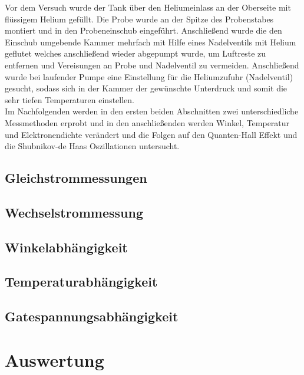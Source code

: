 \documentclass[12pt,a4paper]{article}
\begin{document}
	Vor dem Versuch wurde der Tank über den Heliumeinlass an der Oberseite mit flüssigem Helium gefüllt. Die Probe wurde an der Spitze des Probenstabes montiert und in den Probeneinschub eingeführt. Anschließend wurde die den Einschub umgebende Kammer mehrfach mit Hilfe eines Nadelventils mit Helium geflutet welches anschließend wieder abgepumpt wurde, um Luftreste zu entfernen und Vereisungen an Probe und Nadelventil zu vermeiden. Anschließend wurde bei laufender Pumpe eine Einstellung für die Heliumzufuhr (Nadelventil) gesucht, sodass sich in der Kammer der gewünschte Unterdruck und somit die sehr tiefen Temperaturen einstellen.\\
	
	Im Nachfolgenden werden in den ersten beiden Abschnitten zwei unterschiedliche Messmethoden erprobt und in den anschließenden werden Winkel, Temperatur und Elektronendichte verändert und die Folgen auf den Quanten-Hall Effekt und die Shubnikov-de Haas Oszillationen untersucht.
	
	\subsection{Gleichstrommessungen}
	\label{ch:dc}
	
	\subsection{Wechselstrommessung}
	\label{ch:ac}
	
	\subsection{Winkelabhängigkeit}
	\label{ch:winkel}
	
	\subsection{Temperaturabhängigkeit}
	\label{ch:temp}
	
	\subsection{Gatespannungsabhängigkeit}
	\label{ch:gate}
	
	
	\newpage
	\clearpage
	
	\section{Auswertung}
	\label{chap:auswertung}
	
	
\end{document}
